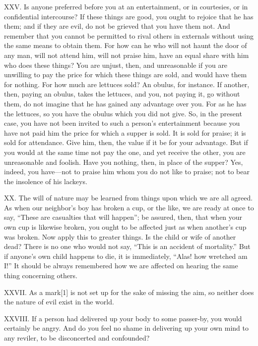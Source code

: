 \documentclass[a4paper]{article}
\begin{document}
XXV. Is anyone preferred before you at an entertainment, or in courtesies, or
in confidential intercourse? If these things are good, you ought to
rejoice that he has them; and if they are evil, do not be grieved that
you have them not. And remember that you cannot be permitted to rival
others in externals without using the same means to obtain them. For how
can he who will not haunt the door of any man, will not attend him, will
not praise him, have an equal share with him who does these things? You
are unjust, then, and unreasonable if you are unwilling to pay the price
for which these things are sold, and would have them for nothing. For how
much are lettuces sold? An obulus, for instance. If another, then, paying
an obulus, takes the lettuces, and you, not paying it, go without them,
do not imagine that he has gained any advantage over you. For as he has
the lettuces, so you have the obulus which you did not give. So, in the
present case, you have not been invited to such a person’s entertainment
because you have not paid him the price for which a supper is sold. It is
sold for praise; it is sold for attendance. Give him, then, the value if
it be for your advantage. But if you would at the same time not pay the
one, and yet receive the other, you are unreasonable and foolish. Have
you nothing, then, in place of the supper? Yes, indeed, you have—not to
praise him whom you do not like to praise; not to bear the insolence of
his lackeys.


XX.
The will of nature may be learned from things upon which we are all
agreed. As when our neighbor’s boy has broken a cup, or the like, we are
ready at once to say, “These are casualties that will happen”; be
assured, then, that when your own cup is likewise broken, you ought to be
affected just as when another’s cup was broken. Now apply this to greater
things. Is the child or wife of another dead? There is no one who would
not say, “This is an accident of mortality.” But if anyone’s own child
happens to die, it is immediately, “Alas! how wretched am I!” It should
be always remembered how we are affected on hearing the same thing
concerning others.


XXVII. As a mark[1] is not set up for the sake of missing the aim, so neither
does the nature of evil exist in the world.


XXVIII. If a person had delivered up your body to some passer-by, you would
certainly be angry. And do you feel no shame in delivering up your own
mind to any reviler, to be disconcerted and confounded?
\end{document}
